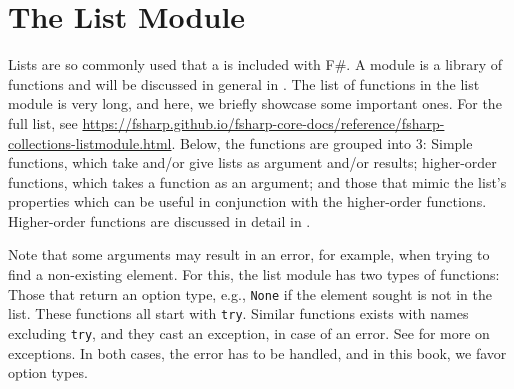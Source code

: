 \documentclass[fsharpNotes.tex]{subfiles}
\begin{document}
 
\section{The List Module}
Lists are so commonly used that a  is included with F\#. A module is a library of functions and will be discussed in general in . The list of functions in the list module is very long, and here, we briefly showcase some important ones. For the full list, see \url{https://fsharp.github.io/fsharp-core-docs/reference/fsharp-collections-listmodule.html}. Below, the functions are grouped into 3: Simple functions, which take and/or give lists as argument and/or results; higher-order functions, which takes a function as an argument; and those that mimic the list's properties which can be useful in conjunction with the higher-order functions. Higher-order functions are discussed in detail in .

Note that some arguments may result in an error, for example, when trying to find a non-existing element. For this, the list module has two types of functions: Those that return an option type, e.g., \lstinline{None} if the element sought is not in the list. These functions all start with \texttt{try}. Similar functions exists with names excluding \texttt{try}, and they cast an exception, in case of an error. See  for more on exceptions. In both cases, the error has to be handled, and in this book, we favor option types.
\end{document}
